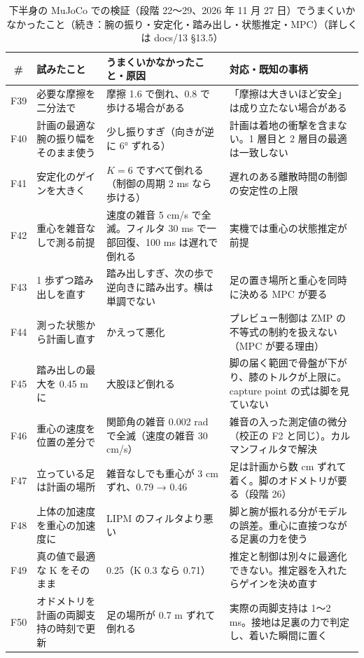 \documentclass[paper=a4paper,fontsize=10pt,twocolumn,column_gap=2zw,line_length=24zw,number_of_lines=46,head_space=20mm]{jlreq}
\begin{document}
\begin{table}[t]\centering\footnotesize
\caption{下半身の MuJoCo での検証（段階 22〜29、2026 年 11 月 27 日）でうまくいかなかったこと（続き：腕の振り・安定化・踏み出し・状態推定・MPC）（詳しくは docs/13 §13.5）}\label{tab:fail4}
\setlength{\tabcolsep}{3pt}
\begin{tabular}{cp{}p{}p{}}\toprule
\# & 試みたこと & うまくいかなかったこと・原因 & 対応・既知の事柄 \\\midrule
F39 & 必要な摩擦を二分法で & 摩擦 1.6 で倒れ、0.8 で歩ける場合がある & 「摩擦は大きいほど安全」は成り立たない場合がある \\
F40 & 計画の最適な腕の振り幅をそのまま使う & 少し振りすぎ（向きが逆に 6° ずれる） & 計画は着地の衝撃を含まない。1 層目と 2 層目の最適は一致しない \\
F41 & 安定化のゲインを大きく & $K=6$ ですべて倒れる（制御の周期 2 ms なら歩ける） & 遅れのある離散時間の制御の安定性の上限 \\
F42 & 重心を雑音なしで測る前提 & 速度の雑音 5 cm/s で全滅。フィルタ 30 ms で一部回復、100 ms は遅れで倒れる & 実機では重心の状態推定が前提 \\
F43 & 1 歩ずつ踏み出しを直す & 踏み出しすぎ、次の歩で逆向きに踏み出す。横は単調でない & 足の置き場所と重心を同時に決める MPC が要る \\
F44 & 測った状態から計画し直す & かえって悪化 & プレビュー制御は ZMP の不等式の制約を扱えない（MPC が要る理由） \\
F45 & 踏み出しの最大を 0.45 m に & 大股ほど倒れる & 脚の届く範囲で骨盤が下がり、膝のトルクが上限に。capture point の式は脚を見ていない \\
F46 & 重心の速度を位置の差分で & 関節角の雑音 0.002 rad で全滅（速度の雑音 30 cm/s） & 雑音の入った測定値の微分（校正の F2 と同じ）。カルマンフィルタで解決 \\
F47 & 立っている足は計画の場所 & 雑音なしでも重心が 3 cm ずれ、0.79 → 0.46 & 足は計画から数 cm ずれて着く。脚のオドメトリが要る（段階 26） \\
F48 & 上体の加速度を重心の加速度に & LIPM のフィルタより悪い & 脚と腕が振れる分がモデルの誤差。重心に直接つながる足裏の力を使う \\
F49 & 真の値で最適な K をそのまま & 0.25（K 0.3 なら 0.71） & 推定と制御は別々に最適化できない。推定器を入れたらゲインを決め直す \\
F50 & オドメトリを計画の両脚支持の時刻で更新 & 足の場所が 0.7 m ずれて倒れる & 実際の両脚支持は 1〜2 ms。接地は足裏の力で判定し、着いた瞬間に置く \\

\end{tabular}
\end{table}
\end{document}
